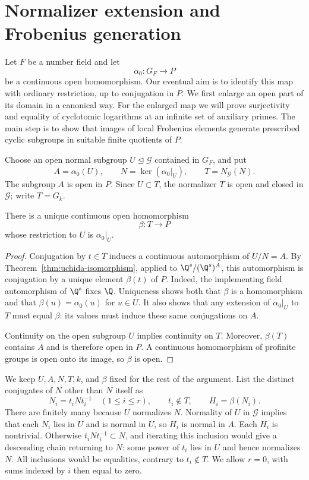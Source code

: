 \section{Normalizer extension and Frobenius generation}\label{sec:generation}

Let $F$ be a number field and let
\[
  \alpha_0:G_F\longrightarrow P
\]
be a continuous open homomorphism. Our eventual aim is to identify this
map with ordinary restriction, up to conjugation in $P$. We first enlarge
an open part of its domain in a canonical way. For the enlarged map we
will prove surjectivity and equality of cyclotomic logarithms at an
infinite set of auxiliary primes. The main step is to show that images
of local Frobenius elements generate prescribed cyclic subgroups in
suitable finite quotients of $P$.

Choose an open normal subgroup $U\trianglelefteq\mathcal G$ contained in
$G_F$, and put
\[
 A=\alpha_0(U),\qquad N=\ker(\alpha_0|_U),\qquad
 T=N_{\mathcal G}(N).
\]
The subgroup $A$ is open in $P$. Since $U\subset T$, the normalizer $T$
is open and closed in $\mathcal G$; write $T=G_k$.

\begin{lemma}\label{lem:normalizer-extension}
There is a unique continuous open homomorphism
\[
  \beta:T\longrightarrow P
\]
whose restriction to $U$ is $\alpha_0|_U$.
\end{lemma}

\begin{proof}
Conjugation by $t\in T$ induces a continuous automorphism of $U/N=A$.
By Theorem~\ref{thm:uchida-isomorphism}, applied to
$\Q^s/(\Q^s)^A$, this automorphism is conjugation by a unique element
$\beta(t)$ of $P$. Indeed, the implementing field automorphism of
$\Q^s$ fixes $\Q$. Uniqueness shows both that $\beta$ is a homomorphism
and that $\beta(u)=\alpha_0(u)$ for $u\in U$. It also shows that any
extension of $\alpha_0|_U$ to $T$ must equal $\beta$: its values must
induce these same conjugations on $A$.

Continuity on the open subgroup $U$ implies continuity on $T$.
Moreover, $\beta(T)$ contains $A$ and is therefore open in $P$.
A continuous homomorphism of profinite groups is open onto its image,
so $\beta$ is open.
\end{proof}

We keep $U,A,N,T,k$, and $\beta$ fixed for the rest of the argument.
List the distinct conjugates of $N$ other than $N$ itself as
\[
 N_i=t_iNt_i^{-1}\quad(1\leq i\leq r),\qquad t_i\notin T,
 \qquad H_i=\beta(N_i).
\]
There are finitely many because $U$ normalizes $N$. Normality of $U$
in $\mathcal G$ implies that each $N_i$ lies in $U$ and is normal in
$U$, so $H_i$ is normal in $A$.
Each $H_i$ is nontrivial. Otherwise $t_iNt_i^{-1}\subset N$, and
iterating this inclusion would give a descending chain returning to
$N$: some power of $t_i$ lies in $U$ and hence normalizes $N$.
All inclusions would be equalities, contrary to $t_i\notin T$.
We allow $r=0$, with sums indexed by $i$ then equal to zero.

